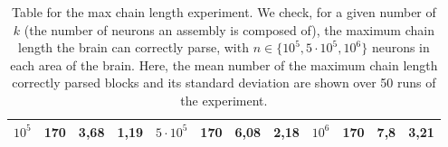 \documentclass[letterpaper]{article}
\begin{document}
\begin{table}
\begin{tabular}{||l|l|l|l||l|l|l|l||l|l|l|l||}
$10^5$ & 170 & 3,68 & 1,19 & $5\cdot 10^5$ & 170 & 6,08  & 2,18 & $10^6$ & 170 & 7,8   & 3,21 \\ \hline
\end{tabular}
\caption{Table for the max chain length experiment. We check, for a given number of $k$ (the number of neurons an assembly is composed of), the maximum chain length the brain can correctly parse, with $n \in \{10^5, 5\cdot 10^5, 10^6\}$ neurons in each area of the brain. Here, the mean number of the maximum chain length correctly parsed blocks and its standard deviation are shown over 50 runs of the experiment.}
\label{table:maxchain_given_k}
\end{table}
 
\end{document}
